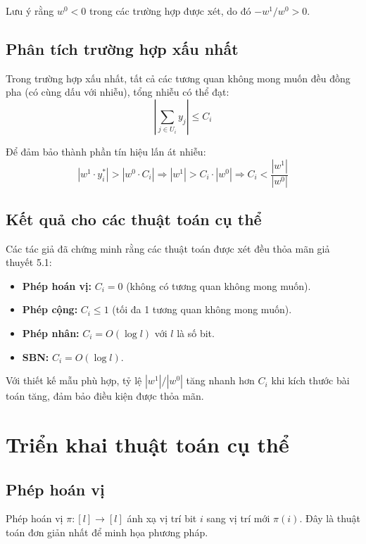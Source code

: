 Lưu ý rằng $w^0 < 0$ trong các trường hợp được xét, do đó $-w^1/w^0 > 0$.

\subsection{Phân tích trường hợp xấu nhất}

Trong trường hợp xấu nhất, tất cả các tương quan không mong muốn đều đồng pha (có cùng dấu với nhiễu), tổng nhiễu có thể đạt:
\begin{equation}
    \left|\sum_{j \in U_i} y_j\right| \leq C_i
\end{equation}

Để đảm bảo thành phần tín hiệu lấn át nhiễu:
\begin{equation}
    |w^1 \cdot y_i^*| > |w^0 \cdot C_i| \Rightarrow |w^1| > C_i \cdot |w^0| \Rightarrow C_i < \frac{|w^1|}{|w^0|}
\end{equation}

\subsection{Kết quả cho các thuật toán cụ thể}

Các tác giả đã chứng minh rằng các thuật toán được xét đều thỏa mãn giả thuyết 5.1:
\begin{itemize}
    \item \textbf{Phép hoán vị:} $C_i = 0$ (không có tương quan không mong muốn).
    \item \textbf{Phép cộng:} $C_i \leq 1$ (tối đa 1 tương quan không mong muốn).
    \item \textbf{Phép nhân:} $C_i = O(\log l)$ với $l$ là số bit.
    \item \textbf{SBN:} $C_i = O(\log l)$.
\end{itemize}

Với thiết kế mẫu phù hợp, tỷ lệ $|w^1|/|w^0|$ tăng nhanh hơn $C_i$ khi kích thước bài toán tăng, đảm bảo điều kiện được thỏa mãn.

\section{Triển khai thuật toán cụ thể}

\subsection{Phép hoán vị}

Phép hoán vị $\pi: [l] \rightarrow [l]$ ánh xạ vị trí bit $i$ sang vị trí mới $\pi(i)$. Đây là thuật toán đơn giản nhất để minh họa phương pháp.

